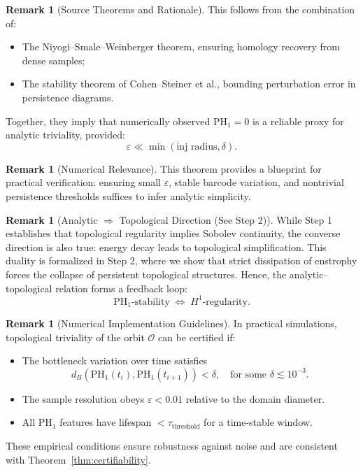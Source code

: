 \documentclass[11pt]{article}
\theoremstyle{definition}
\newtheorem{remark}[theorem]{Remark}
\begin{document}
\begin{remark}[Source Theorems and Rationale]
This follows from the combination of:
\begin{itemize}
    \item The Niyogi–Smale–Weinberger theorem, ensuring homology recovery from dense samples;
    \item The stability theorem of Cohen–Steiner et al., bounding perturbation error in persistence diagrams.
\end{itemize}
Together, they imply that numerically observed $\mathrm{PH}_1 = 0$ is a reliable proxy for analytic triviality, provided:
\[
\varepsilon \ll \min(\text{inj radius}, \delta).
\]
\end{remark}

\begin{remark}[Numerical Relevance]
This theorem provides a blueprint for practical verification: ensuring small $\varepsilon$, stable barcode variation, and nontrivial persistence thresholds suffices to infer analytic simplicity.
\end{remark}

\begin{remark}[Analytic $\Rightarrow$ Topological Direction (See Step 2)]
While Step 1 establishes that topological regularity implies Sobolev continuity, the converse direction is also true: energy decay leads to topological simplification. This duality is formalized in Step 2, where we show that strict dissipation of enstrophy forces the collapse of persistent topological structures. Hence, the analytic–topological relation forms a feedback loop:
\[
\mathrm{PH}_1\text{-stability} \;\Longleftrightarrow\; H^1\text{-regularity}.
\]
\end{remark}

\begin{remark}[Numerical Implementation Guidelines]
In practical simulations, topological triviality of the orbit $\mathcal{O}$ can be certified if:
\begin{itemize}
    \item The bottleneck variation over time satisfies
    \[
    d_B(\mathrm{PH}_1(t_i), \mathrm{PH}_1(t_{i+1})) < \delta, \quad \text{for some } \delta \lesssim 10^{-3}.
    \]
    \item The sample resolution obeys $\varepsilon < 0.01$ relative to the domain diameter.
    \item All $\mathrm{PH}_1$ features have lifespan $< \tau_\text{threshold}$ for a time-stable window.
\end{itemize}
These empirical conditions ensure robustness against noise and are consistent with Theorem~\ref{thm:certifiability}.
\end{remark}
\end{document}
